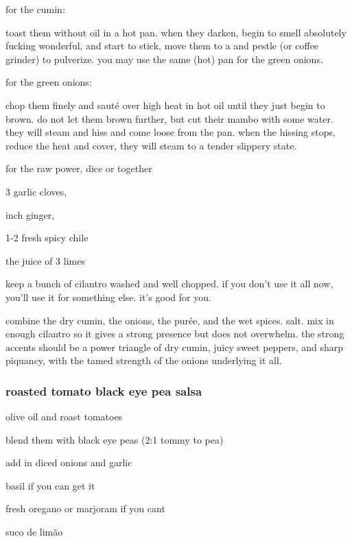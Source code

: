 for the cumin:

toast them without oil in a hot pan. when they darken, begin to smell
absolutely fucking wonderful, and start to stick, move them to a
 and pestle (or coffee grinder) to pulverize. you may use the
same (hot) pan for the green onions.

for the green onions:

chop them finely and saut\'{e} over high heat in hot oil until they
just begin to brown. do not let them brown further, but cut their
mambo with some water. they will steam and hiss and come loose from
the pan. when the hissing stops, reduce the heat and cover, they will
steam to a tender slippery state.

for the raw power, dice or  together

\begin{ingredients}
  \item 3 garlic cloves,
  \item \onehalf inch ginger,
  \item 1-2 fresh spicy chile
  \item the juice of 3 limes
\end{ingredients}

keep a bunch of cilantro washed and well chopped. if you don't use it
all now, you'll use it for something else. it's good for you.

combine the dry cumin, the onions, the pur\'{e}e, and the wet
spices. salt. mix in enough cilantro so it gives a strong presence but
does not overwhelm. the strong accents should be a power triangle of
dry cumin, juicy sweet peppers, and sharp piquancy, with the tamed
strength of the onions underlying it all.

\subsubsection{roasted tomato black eye pea salsa}

\begin{ingredients}
  \item olive oil and roast tomatoes
  \item blend them with black eye peas (2:1 tommy to pea)
  \item add in diced onions and garlic
  \item basil if you can get it
  \item fresh oregano or marjoram if you cant
  \item suco de lim\~{a}o
\end{ingredients}


